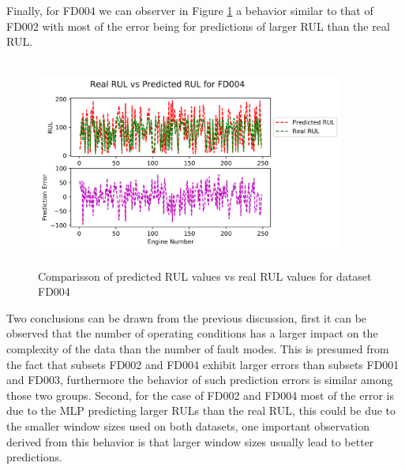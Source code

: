 \documentclass[preprint,12pt]{elsarticle}%
\begin{document}
Finally, for FD004 we can observer in Figure \ref{Fig:rul_plots_dataset_4} a behavior similar to that of FD002 with most of the error being for predictions of larger RUL than the real RUL.

\begin{figure}[!htb]
\begin{center}
\includegraphics[height=2.7in, width=4in]{Figures/rul_plots_dataset_4.png}
\caption{Comparisson of predicted RUL values vs real RUL values for dataset FD004}
\label{Fig:rul_plots_dataset_4}
\end{center}
\end{figure}

\pagebreak

Two conclusions can be drawn from the previous discussion, first it can be observed that the number of operating conditions has a larger impact on the complexity of the data than the number of fault modes. This is presumed from the fact that subsets FD002 and FD004 exhibit larger errors than subsets FD001 and FD003, furthermore the behavior of such prediction errors is similar among those two groups. Second, for the case of FD002 and FD004 most of the error is due to the MLP predicting larger RULs than the real RUL, this could be due to the smaller window sizes used on both datasets, one important observation  derived from this behavior is that larger window sizes usually lead to better predictions.


\end{document}
